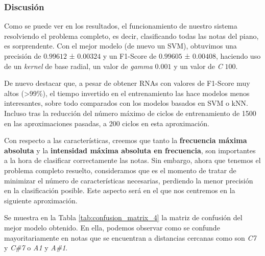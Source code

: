 \documentclass[12pt]{article}
\begin{document}
\subsubsection{Discusión}

Como se puede ver en los resultados, el funcionamiento de nuestro sistema resolviendo el problema completo, es decir, clasificando todas las notas
del piano, es sorprendente. Con el mejor modelo (de nuevo un SVM), obtuvimos una precisión de $0.99612$ ± $0.00324$ y un F1-Score de $0.99605$ ± $0.00408$,
haciendo uso de un \textit{kernel} de base radial, un valor de \textit{gamma} $0.001$ y un valor de \textit{C} $100$.

\bigskip
De nuevo destacar que, a pesar de obtener RNAs con valores de F1-Score muy altos (\textgreater99\%), el tiempo invertido en el entrenamiento las
hace modelos menos interesantes, sobre todo comparados con los modelos basados en SVM o kNN. Incluso tras la reducción del número máximo de
ciclos de entrenamiento de 1500 en las aproximaciones pasadas, a 200 ciclos en esta aproximación.

\bigskip
Con respecto a las características, creemos que tanto la \textbf{frecuencia máxima absoluta} y la \textbf{intensidad máxima absoluta en frecuencia},
son importantes a la hora de clasificar correctamente las notas. Sin embargo, ahora que tenemos el problema completo resuelto, consideramos que
es el momento de tratar de minimizar el número de características necesarias, perdiendo la menor precisión en la clasificación posible.
Este aspecto será en el que nos centremos en la siguiente aproximación.

\bigskip
Se muestra en la Tabla \ref{tab:confusion_matrix_4} la matriz de confusión del mejor modelo obtenido. En ella, podemos observar como se
confunde mayoritariamente en notas que se encuentran a distancias cercanas como son \textit{C7} y \textit{C\#7} o \textit{A1} y \textit{A\#1}. 
\end{document}
